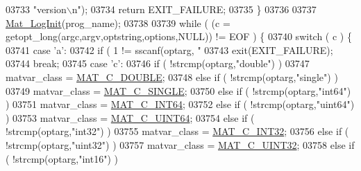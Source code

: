 \begin{DoxyCode}
{{{{{{{{{{{{{{{{{{{{{{{{{{{{{{{{{{{{{{{{{{{{{{{{{{{{{{{{{{{{{{{03733                 \textcolor{stringliteral}{"version\(\backslash\)n"});
03734         \textcolor{keywordflow}{return} EXIT\_FAILURE;
03735     \}
03736 
03737     \hyperlink{group__mat__util_ga0d30e03216ceaab7c0a4ff878b26f89f}{Mat\_LogInit}(prog\_name);
03738 
03739     \textcolor{keywordflow}{while} ( (c = getopt\_long(argc,argv,optstring,options,NULL)) != EOF ) \{
03740         \textcolor{keywordflow}{switch} ( c ) \{
03741             \textcolor{keywordflow}{case} \textcolor{charliteral}{'a'}:
03742                 \textcolor{keywordflow}{if} ( 1 != sscanf(optarg, \textcolor{stringliteral}{"%
03743                     exit(EXIT\_FAILURE);
03744                 \textcolor{keywordflow}{break};
03745             \textcolor{keywordflow}{case} \textcolor{charliteral}{'c'}:
03746                 \textcolor{keywordflow}{if} ( !strcmp(optarg,\textcolor{stringliteral}{"double"}) )
03747                     matvar\_class = \hyperlink{group___m_a_t_ggad4d60ae7b709fc81bfd744fb4c857c40a5d70e0862e5bdb7bd86bf7ba5948f307}{MAT\_C\_DOUBLE};
03748                 \textcolor{keywordflow}{else} \textcolor{keywordflow}{if} ( !strcmp(optarg,\textcolor{stringliteral}{"single"}) )
03749                     matvar\_class = \hyperlink{group___m_a_t_ggad4d60ae7b709fc81bfd744fb4c857c40a2825631e26a961cbe0f79db50a39cea2}{MAT\_C\_SINGLE};
03750                 \textcolor{keywordflow}{else} \textcolor{keywordflow}{if} ( !strcmp(optarg,\textcolor{stringliteral}{"int64"}) )
03751                     matvar\_class = \hyperlink{group___m_a_t_ggad4d60ae7b709fc81bfd744fb4c857c40a1ea83bcde49b35477494412973f82409}{MAT\_C\_INT64};
03752                 \textcolor{keywordflow}{else} \textcolor{keywordflow}{if} ( !strcmp(optarg,\textcolor{stringliteral}{"uint64"}) )
03753                     matvar\_class = \hyperlink{group___m_a_t_ggad4d60ae7b709fc81bfd744fb4c857c40a86470e25c3763d9a24623f04326195dd}{MAT\_C\_UINT64};
03754                 \textcolor{keywordflow}{else} \textcolor{keywordflow}{if} ( !strcmp(optarg,\textcolor{stringliteral}{"int32"}) )
03755                     matvar\_class = \hyperlink{group___m_a_t_ggad4d60ae7b709fc81bfd744fb4c857c40adb44fc39694e3152ae5e69470a2fefe8}{MAT\_C\_INT32};
03756                 \textcolor{keywordflow}{else} \textcolor{keywordflow}{if} ( !strcmp(optarg,\textcolor{stringliteral}{"uint32"}) )
03757                     matvar\_class = \hyperlink{group___m_a_t_ggad4d60ae7b709fc81bfd744fb4c857c40a9a17a7edd45b19ef68197db81b27e816}{MAT\_C\_UINT32};
03758                 \textcolor{keywordflow}{else} \textcolor{keywordflow}{if} ( !strcmp(optarg,\textcolor{stringliteral}{"int16"}) )
}}}}}}}}}}}}}}}}}}}}}}}}}}}}}}}}}}}}}}}}}}}}}}}}}}}}}}}}}}}}}}}}
\end{DoxyCode}
